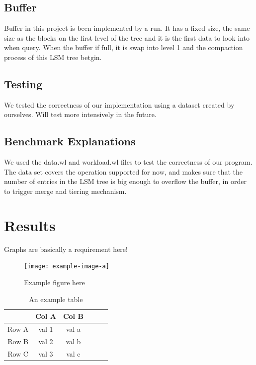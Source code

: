 \documentclass[sigconf]{acmart}
\begin{document}
    \subsection{Buffer}
    Buffer in this project is been implemented by a run. It has a fixed size, the same size as the blocks on the first level of the tree and it is the first data to look into when query. When the buffer if full, it is swap into level 1 and the compaction process of this LSM tree betgin.
    
    \subsection{Testing}
    We tested the correctness of our implementation using a dataset created by ourselves. Will test more intensively in the future.

    \subsection{Benchmark Explanations}

    We used the data.wl and workload.wl files to test the correctness of our program. The data set covers the operation supported for now, and makes sure that the number of entries in the LSM tree is big enough to overflow the buffer, in order to trigger merge and tiering mechanism.


    \section{Results}
    Graphs are basically a requirement here!

    \begin{figure}[ht]
        \texttt{[image: example-image-a]}
        \caption{Example figure here}
        \label{fig:filler}
    \end{figure}

    \begin{table}[H]
        \caption{An example table}
        \label{tab:ex}
        \centering

        \begin{tabular}{c |c c c c c}
            \hline\hline
            & Col A & Col B \\
            \hline
            Row A & val 1 & val a \\
            Row B & val 2 & val b \\
            Row C & val 3 & val c \\
            \hline
        \end{tabular}
    \end{table}
\end{document}
